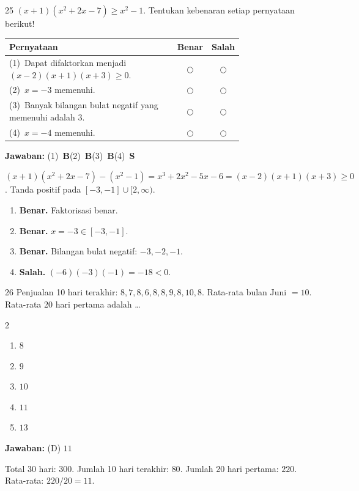 \documentclass[11pt]{article}
\newcommand{\jawaban}[1]{%
  \noindent\colorbox{gold!30}{\parbox{\dimexpr\linewidth-2\fboxsep\relax}{%
    \textbf{Jawaban:} #1}}\par\smallskip}
\newenvironment{pilB}{%
  \par\smallskip\begin{multicols}{2}
  \begin{enumerate}[label=(\Alph*),leftmargin=*,itemsep=1pt,topsep=3pt]}%
  {\end{enumerate}\end{multicols}}
\begin{document}
\begin{soal}{25}
$(x+1)(x^2+2x-7)\geq x^2-1$.
Tentukan kebenaran setiap pernyataan berikut!

\par\smallskip
{\renewcommand{\arraystretch}{1.4}%
\begin{tabular}{@{}p{0.76\linewidth}cc@{}}
\hline\textbf{Pernyataan}&\textbf{Benar}&\textbf{Salah}\\\hline
(1)~Dapat difaktorkan menjadi $(x-2)(x+1)(x+3)\geq0$.&$\bigcirc$&$\bigcirc$\\
(2)~$x=-3$ memenuhi.&$\bigcirc$&$\bigcirc$\\
(3)~Banyak bilangan bulat negatif yang memenuhi adalah $3$.&$\bigcirc$&$\bigcirc$\\
(4)~$x=-4$ memenuhi.&$\bigcirc$&$\bigcirc$\\\hline
\end{tabular}}
\end{soal}
\begin{pembox}
\jawaban{(1)~\textbf{B}\quad(2)~\textbf{B}\quad(3)~\textbf{B}\quad(4)~\textbf{S}}
$(x+1)(x^2+2x-7)-(x^2-1)=x^3+2x^2-5x-6=(x-2)(x+1)(x+3)\geq0$.
Tanda positif pada $[-3,-1]\cup[2,\infty)$.
\begin{enumerate}[leftmargin=*,topsep=2pt,itemsep=2pt]
\item \textbf{Benar.} Faktorisasi benar.
\item \textbf{Benar.} $x=-3\in[-3,-1]$.
\item \textbf{Benar.} Bilangan bulat negatif: $-3,-2,-1$.
\item \textbf{Salah.} $(-6)(-3)(-1)=-18<0$.
\end{enumerate}
\end{pembox}

\begin{soal}{26}
Penjualan 10 hari terakhir: $8,7,8,6,8,8,9,8,10,8$. Rata-rata bulan Juni $=10$.
Rata-rata 20 hari pertama adalah \ldots
\begin{pilB}\item $8$\item $9$\item $10$\item $11$\item $13$\end{pilB}
\end{soal}
\begin{pembox}
\jawaban{(D) $11$}
Total 30 hari: $300$. Jumlah 10 hari terakhir: $80$. Jumlah 20 hari pertama: $220$.
Rata-rata: $220/20=11$.
\end{pembox}
\end{document}
